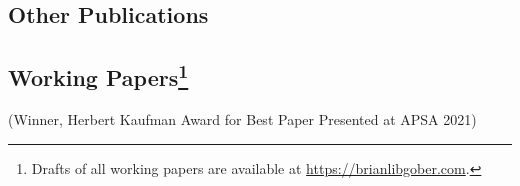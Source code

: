 \documentclass[12pt,letterpaper]{report}
\newcounter{pubcount}
\newcommand{\countthis}{%
}
\begin{document}
    


    \subsection*{Other Publications}
    \begin{tablist}
    \item[2026] \tab{}\countthis{}
    \item[2024] \tab{}\countthis{} 
    \item[2023] \tab{}\countthis{}
    \item[2020] \tab{}\countthis{}
    \item[2018] \tab{}\countthis{}
    \item[2015] \tab{}\countthis{}
    \end{tablist}
    
	\subsection*{Working Papers\footnote[2]{Drafts of all working papers are available at \href{https://brianlibgober.com}{https://brianlibgober.com}.}}
    \begin{tablist}
    \item[] 
    \item[] 
    \item[]  (Winner, Herbert Kaufman Award for Best Paper Presented at APSA 2021)
	\item[] 
    \item[]   %
    \item[] 
    \end{tablist}
    
\end{document}
